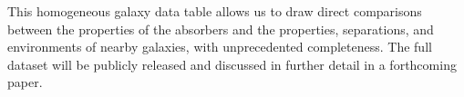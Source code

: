 \documentclass[iop]{emulateapj-rtx4}
\begin{document}
This homogeneous galaxy data table allows us to draw direct comparisons between the properties of the absorbers and the properties, separations, and environments of nearby galaxies, with unprecedented completeness. The full dataset will be publicly released and discussed in further detail in a forthcoming paper.


\begin{figure}[h!]
\centering

\end{figure}
\end{document}
